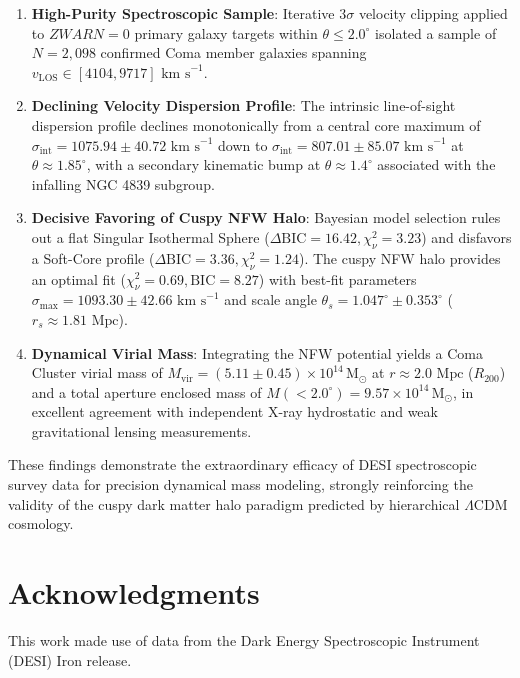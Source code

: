 \documentclass[twocolumn]{aastex631}
\begin{document}
\begin{enumerate}
	\item \textbf{High-Purity Spectroscopic Sample}: Iterative $3\sigma$ velocity clipping applied to $ZWARN=0$ primary galaxy targets within $\theta \le 2.0^\circ$ isolated a sample of $N=2,098$ confirmed Coma member galaxies spanning $v_{\text{LOS}} \in [4104, 9717] \text{ km s}^{-1}$.

	\item \textbf{Declining Velocity Dispersion Profile}: The intrinsic line-of-sight dispersion profile declines monotonically from a central core maximum of $\sigma_{\text{int}} = 1075.94 \pm 40.72 \text{ km s}^{-1}$ down to $\sigma_{\text{int}} = 807.01 \pm 85.07 \text{ km s}^{-1}$ at $\theta \approx 1.85^\circ$, with a secondary kinematic bump at $\theta \approx 1.4^\circ$ associated with the infalling NGC 4839 subgroup.

	\item \textbf{Decisive Favoring of Cuspy NFW Halo}: Bayesian model selection rules out a flat Singular Isothermal Sphere ($\Delta \text{BIC} = 16.42, \chi_\nu^2 = 3.23$) and disfavors a Soft-Core profile ($\Delta \text{BIC} = 3.36, \chi_\nu^2 = 1.24$). The cuspy NFW halo provides an optimal fit ($\chi_\nu^2 = 0.69, \text{BIC} = 8.27$) with best-fit parameters $\sigma_{\text{max}} = 1093.30 \pm 42.66 \text{ km s}^{-1}$ and scale angle $\theta_s = 1.047^\circ \pm 0.353^\circ$ ($r_s \approx 1.81 \text{ Mpc}$).

	\item \textbf{Dynamical Virial Mass}: Integrating the NFW potential yields a Coma Cluster virial mass of $M_{\text{vir}} = (5.11 \pm 0.45) \times 10^{14} \, \mathrm{M}_\odot$ at $r \approx 2.0 \text{ Mpc}$ ($R_{200}$) and a total aperture enclosed mass of $M(<2.0^\circ) = 9.57 \times 10^{14} \, \mathrm{M}_\odot$, in excellent agreement with independent X-ray hydrostatic and weak gravitational lensing measurements.
\end{enumerate}

These findings demonstrate the extraordinary efficacy of DESI spectroscopic survey data for precision dynamical mass modeling, strongly reinforcing the validity of the cuspy dark matter halo paradigm predicted by hierarchical $\Lambda\text{CDM}$ cosmology.

\section*{Acknowledgments}
This work made use of data from the Dark Energy Spectroscopic Instrument (DESI) Iron release. 
\end{document}
